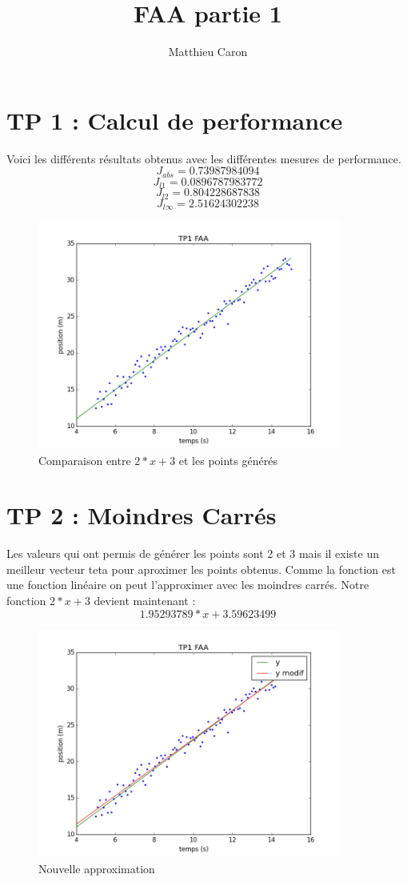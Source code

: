 \documentclass[a4paper,10pt]{report}
\title{FAA partie 1}
\author{Matthieu Caron}
\begin{document}
\maketitle

\section{TP 1 : Calcul de performance}

Voici les différents résultats obtenus avec les différentes mesures de performance.
$$J_{abs} = 0.73987984094 $$
$$J_{l1} = 0.0896787983772$$
$$J_{l2} = 0.804228687838$$
$$J_{l\infty} = 2.51624302238$$



\begin{figure}[!h]
 \centering
 \caption{Comparaison entre $2*x + 3$ et les points générés}
 \includegraphics[width=10cm]{tp1.png}
\end{figure}

\section{TP 2 :  Moindres Carrés}
Les valeurs qui ont permis de générer les points sont 2 et 3 mais il existe un meilleur vecteur teta pour aproximer 
les points obtenus. Comme la fonction est une fonction linéaire on peut l'approximer avec les moindres carrés.
Notre fonction $2*x+3$ devient maintenant : $$1.95293789 * x + 3.59623499 $$

\begin{figure}[!h]
 \centering
 \caption{Nouvelle approximation}
 \includegraphics[width=10cm]{tp2.png}
\end{figure}
\end{document}
